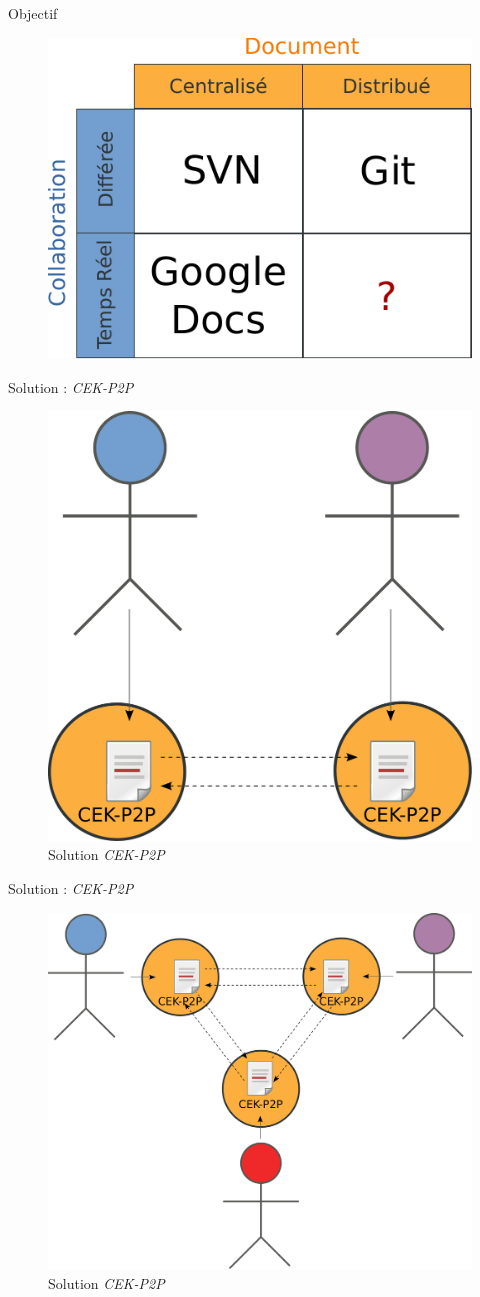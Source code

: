 \begin{frame}{Objectif}
  \begin{figure}
    \center
    \includegraphics[width=.7\textwidth]{includes/tab2.pdf}
  \end{figure}
\end{frame}

\begin{frame}{Solution : \emph{CEK-P2P}}
  \begin{figure}
    \center
    \includegraphics[width=.5\textwidth]{includes/cekp2p.pdf}
    \caption{Solution \emph{CEK-P2P}}
  \end{figure}
\end{frame}

\begin{frame}{Solution : \emph{CEK-P2P}}
  \begin{figure}
    \center
    \includegraphics[width=.5\textwidth]{includes/cekp2p3perso.pdf}
    \caption{Solution \emph{CEK-P2P}}
  \end{figure}
\end{frame}

